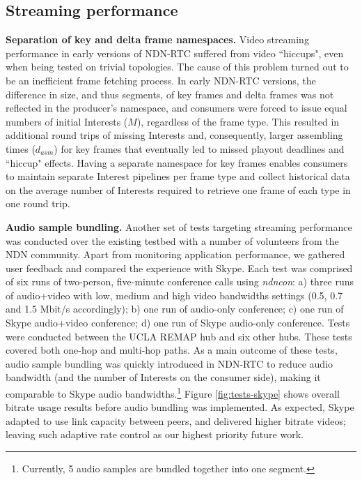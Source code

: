 \documentclass{icn/sig-alternate-2013} %
\newcommand{\ndnrtcName}{NDN-RTC} %
\newcommand{\ndnconName}{\emph{ndncon}}
\begin{document}
\subsection{Streaming performance}

\textbf{Separation of key and delta frame namespaces.} Video streaming performance in early versions of \ndnrtcName{} suffered from video ``hiccups", even when being tested on trivial topologies. The cause of this problem turned out to be an inefficient frame fetching process. In early \ndnrtcName{} versions, the difference in size, and thus segments, of key frames and delta frames was not reflected in the producer's namespace, and consumers were forced to issue equal numbers of initial Interests ($M$), regardless of the frame type. This resulted in additional round trips of missing Interests and, consequently, larger assembling times ($d_{asm}$) for key frames that eventually led to missed playout deadlines and ``hiccup" effects. Having a separate namespace for key frames enables consumers to maintain separate Interest pipelines per frame type and collect historical data on the average number of Interests required to retrieve one frame of each type in one round trip. 

\textbf{Audio sample bundling.}
Another set of tests targeting streaming performance was conducted over the existing testbed with a number of volunteers from the NDN community. Apart from monitoring application performance, we gathered user feedback and compared the experience with Skype. 
Each test was comprised of six runs of two-person, five-minute conference calls using \ndnconName{}: a) three runs of audio+video with low, medium and high video bandwidths settings (0.5, 0.7 and 1.5 Mbit/s accordingly); b) one run of audio-only conference; c) one run of Skype audio+video conference; d) one run of Skype audio-only conference. Tests were conducted between the UCLA REMAP hub and six other hubs. These tests covered both one-hop and multi-hop paths. 
As a main outcome of these tests, audio sample bundling was quickly introduced in \ndnrtcName{} to reduce audio bandwidth (and the number of Interests on the consumer side), making it comparable to Skype audio bandwidths.\footnote{Currently, 5 audio samples are bundled together into one segment.} Figure \ref{fig:tests-skype} shows overall bitrate usage results before audio bundling was implemented. As expected, Skype adapted to use link capacity between peers, and delivered higher bitrate videos; leaving such adaptive rate control as our highest priority future work. %
\end{document}
